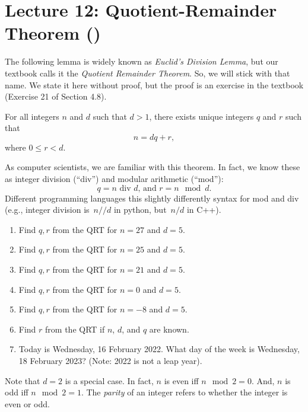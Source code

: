 \section*{Lecture 12: Quotient-Remainder Theorem ()}

The following lemma is widely known as \emph{Euclid's Division Lemma}, but our
textbook calls it the \emph{Quotient Remainder Theorem}.  So, we will stick with
that name.  We state it here without proof, but the proof is an exercise in the
textbook (Exercise 21 of Section 4.8).

\begin{theorem}
    For all integers $n$ and $d$ such that $d > 1$,
    there exists unique integers $q$
    and $r$ such that
    $$ n = dq + r, $$
    where $0 \leq r < d$.
\end{theorem}

As computer scientists, we are familiar with this theorem.  In fact, we know
these as integer division (``div'') and modular arithmetic (``mod''):
$$q = n \text{ div } d \text{, and } r= n\mod d. $$
Different programming languages this slightly differently syntax for mod and
div (e.g., integer
division is~$n//d$
in python, but~$n/d$ in C++).



\begin{enumerate}
    \item Find $q,r$ from the QRT for $n=27$ and $d=5$.
        \practice
    \item Find $q,r$ from the QRT for $n=25$ and $d=5$.
        \practice
    \item Find $q,r$ from the QRT for $n=21$ and $d=5$.
        \practice
    \pagebreak
    \item Find $q,r$ from the QRT for $n=0$ and $d=5$.
        \practice
    \item Find $q,r$ from the QRT for $n=-8$ and $d=5$.
        \practice
    \item Find $r$ from the QRT if $n$, $d$, and $q$ are known.
        \practice
    \item Today is Wednesday, 16 February 2022.  What day of the week is
        Wednesday, 18 February 2023? (Note: 2022 is not a leap year).
        \practice
\end{enumerate}

Note that $d=2$ is a special case.  In fact, $n$ is even iff $n \mod
2 = 0$.  And, $n$ is odd iff $n \mod 2 = 1$.  The \emph{parity} of an integer
refers to whether the integer is even or odd.

